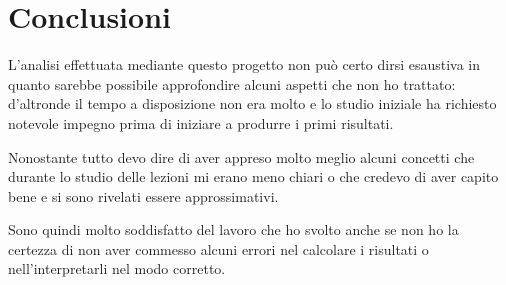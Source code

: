 \section{Conclusioni}
L'analisi effettuata mediante questo progetto non può certo dirsi esaustiva in quanto sarebbe possibile approfondire alcuni aspetti che non ho trattato: d'altronde il tempo a disposizione non era molto e lo studio iniziale ha richiesto notevole impegno prima di iniziare a produrre i primi risultati.

Nonostante tutto devo dire di aver appreso molto meglio alcuni concetti che durante lo studio delle lezioni mi erano meno chiari o che credevo di aver capito bene e si sono rivelati essere approssimativi.

Sono quindi molto soddisfatto del lavoro che ho svolto anche se non ho la certezza di non aver commesso alcuni errori nel calcolare i risultati o nell'interpretarli nel modo corretto.